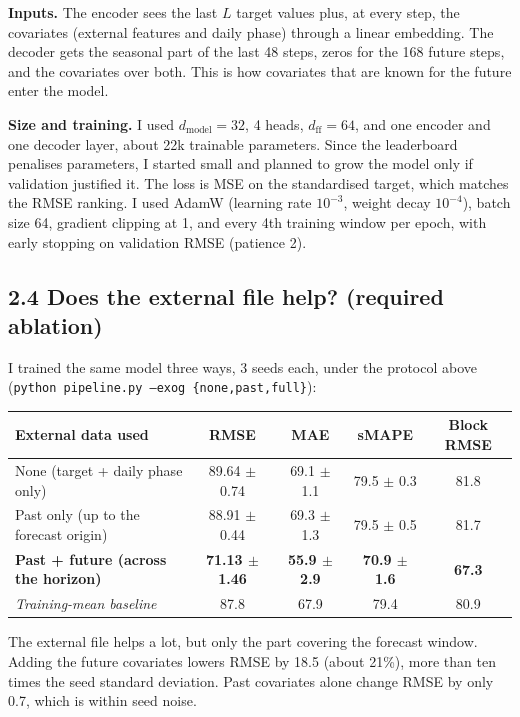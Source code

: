 \documentclass[11pt]{article}
\begin{document}
\textbf{Inputs.} The encoder sees the last $L$ target values plus, at every step, the covariates
(external features and daily phase) through a linear embedding. The decoder gets the seasonal part
of the last 48 steps, zeros for the 168 future steps, and the covariates over both. This is how
covariates that are known for the future enter the model.

\textbf{Size and training.} I used $d_\text{model}=32$, 4 heads, $d_\text{ff}=64$, and one encoder
and one decoder layer, about 22k trainable parameters. Since the leaderboard penalises parameters,
I started small and planned to grow the model only if validation justified it. The loss is MSE on
the standardised target, which matches the RMSE ranking. I used AdamW (learning rate $10^{-3}$,
weight decay $10^{-4}$), batch size 64, gradient clipping at 1, and every 4th training window per
epoch, with early stopping on validation RMSE (patience 2).

\subsection*{2.4 Does the external file help? (required ablation)}

I trained the same model three ways, 3 seeds each, under the protocol above
(\texttt{python pipeline.py --exog \{none,past,full\}}):
\begin{center}\small
\begin{tabular}{lcccc}\toprule
External data used & RMSE & MAE & sMAPE & Block RMSE\\\midrule
None (target + daily phase only)               & 89.64 $\pm$ 0.74 & 69.1 $\pm$ 1.1 & 79.5 $\pm$ 0.3 & 81.8\\
Past only (up to the forecast origin)          & 88.91 $\pm$ 0.44 & 69.3 $\pm$ 1.3 & 79.5 $\pm$ 0.5 & 81.7\\
\textbf{Past + future (across the horizon)}    & \textbf{71.13 $\pm$ 1.46} & \textbf{55.9 $\pm$ 2.9} & \textbf{70.9 $\pm$ 1.6} & \textbf{67.3}\\
\midrule
\emph{Training-mean baseline} & 87.8 & 67.9 & 79.4 & 80.9\\\bottomrule
\end{tabular}\end{center}

The external file helps a lot, but only the part covering the forecast window. Adding the future
covariates lowers RMSE by 18.5 (about 21\%), more than ten times the seed standard deviation. Past
covariates alone change RMSE by only 0.7, which is within seed noise.
\end{document}
